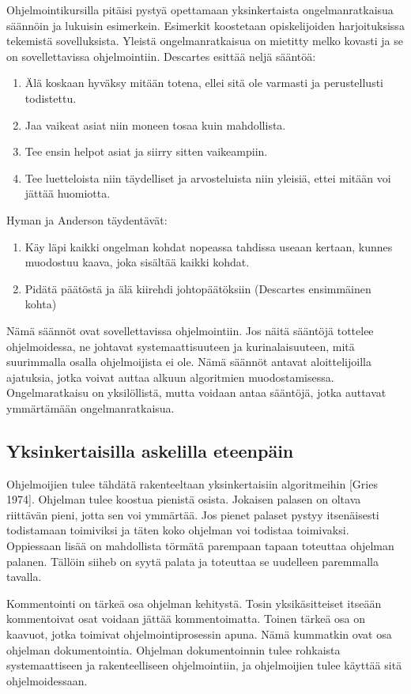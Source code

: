 \documentclass[a4paper]{article}
\begin{document}
Ohjelmointikursilla pitäisi pystyä opettamaan yksinkertaista ongelmanratkaisua säännöin ja lukuisin esimerkein. Esimerkit koostetaan opiskelijoiden harjoituksissa tekemistä sovelluksista. Yleistä ongelmanratkaisua on mietitty melko kovasti ja se on sovellettavissa ohjelmointiin. Descartes esittää neljä sääntöä:

\begin{enumerate}
  \item Älä koskaan hyväksy mitään totena, ellei sitä ole varmasti ja perustellusti todistettu.
  \item Jaa vaikeat asiat niin moneen tosaa kuin mahdollista.
  \item Tee ensin helpot asiat ja siirry sitten vaikeampiin.
  \item Tee luetteloista niin täydelliset ja arvosteluista niin yleisiä, ettei mitään voi jättää huomiotta.
\end{enumerate}

Hyman ja Anderson täydentävät:

\begin{enumerate}
  \item Käy läpi kaikki ongelman kohdat nopeassa tahdissa useaan kertaan, kunnes muodostuu kaava, joka sisältää kaikki kohdat.
  \item Pidätä päätöstä ja älä kiirehdi johtopäätöksiin (Descartes ensimmäinen kohta)
\end{enumerate}

Nämä säännöt ovat sovellettavissa ohjelmointiin. Jos näitä sääntöjä tottelee ohjelmoidessa, ne johtavat systemaattisuuteen ja kurinalaisuuteen, mitä suurimmalla osalla ohjelmoijista ei ole. Nämä säännöt antavat aloittelijoilla ajatuksia, jotka voivat auttaa alkuun algoritmien muodostamisessa. Ongelmaratkaisu on yksilöllistä, mutta voidaan antaa sääntöjä, jotka auttavat ymmärtämään ongelmanratkaisua.

\subsection{Yksinkertaisilla askelilla eteenpäin}

Ohjelmoijien tulee tähdätä rakenteeltaan yksinkertaisiin algoritmeihin [Gries 1974]. Ohjelman tulee koostua pienistä osista. Jokaisen palasen on oltava riittävän pieni, jotta sen voi ymmärtää. Jos pienet palaset pystyy itsenäisesti todistamaan toimiviksi ja täten koko ohjelman voi todistaa toimivaksi. Oppiessaan lisää on mahdollista törmätä parempaan tapaan toteuttaa ohjelman palanen. Tällöin siiheb on syytä palata ja toteuttaa se uudelleen paremmalla tavalla.

Kommentointi on tärkeä osa ohjelman kehitystä. Tosin yksikäsitteiset itseään kommentoivat osat voidaan jättää kommentoimatta. Toinen tärkeä osa on kaavuot, jotka toimivat ohjelmointiprosessin apuna. Nämä kummatkin ovat osa ohjelman dokumentointia. Ohjelman dokumentoinnin tulee rohkaista systemaattiseen ja rakenteelliseen ohjelmointiin, ja ohjelmoijien tulee käyttää sitä ohjelmoidessaan.
\end{document}
